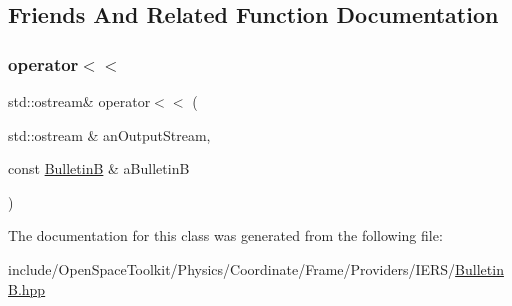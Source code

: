 \subsection{Friends And Related Function Documentation}
\mbox{\label{classostk_1_1physics_1_1coord_1_1frame_1_1provider_1_1iers_1_1_bulletin_b_a36d9e78a5de0361186ca1cb63ab6f1ee}} 
\subsubsection{\texorpdfstring{operator$<$$<$}{operator<<}}
{\footnotesize\ttfamily std\+::ostream\& operator$<$$<$ (\begin{DoxyParamCaption}\item[{std\+::ostream \&}]{an\+Output\+Stream,  }\item[{const \hyperlink{classostk_1_1physics_1_1coord_1_1frame_1_1provider_1_1iers_1_1_bulletin_b}{BulletinB} \&}]{a\+BulletinB }\end{DoxyParamCaption})\hspace{0.3cm}{\ttfamily [friend]}}



The documentation for this class was generated from the following file\+:\begin{DoxyCompactItemize}
\item 
include/\+Open\+Space\+Toolkit/\+Physics/\+Coordinate/\+Frame/\+Providers/\+I\+E\+R\+S/\hyperlink{_bulletin_b_8hpp}{Bulletin\+B.\+hpp}\end{DoxyCompactItemize}
